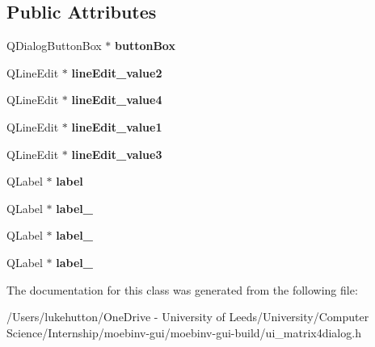 \subsection*{Public Attributes}
\begin{DoxyCompactItemize}
\item 
\mbox{\label{class_ui__matrix4dialog_ae643e32c20b920b6ab7339075a79bd9d}} 
Q\+Dialog\+Button\+Box $\ast$ {\bfseries button\+Box}
\item 
\mbox{\label{class_ui__matrix4dialog_aa24b0549035d7da282a7a26c4076a08b}} 
Q\+Line\+Edit $\ast$ {\bfseries line\+Edit\+\_\+value2}
\item 
\mbox{\label{class_ui__matrix4dialog_a0f6b83ac50476be0a50fe6581c58c9ec}} 
Q\+Line\+Edit $\ast$ {\bfseries line\+Edit\+\_\+value4}
\item 
\mbox{\label{class_ui__matrix4dialog_af76878b0323618ee71de96e1ff096e88}} 
Q\+Line\+Edit $\ast$ {\bfseries line\+Edit\+\_\+value1}
\item 
\mbox{\label{class_ui__matrix4dialog_ab323365f4524b26c3aa16ca9cc2375c3}} 
Q\+Line\+Edit $\ast$ {\bfseries line\+Edit\+\_\+value3}
\item 
\mbox{\label{class_ui__matrix4dialog_a251052fdd26c4f5d32480e10b296be69}} 
Q\+Label $\ast$ {\bfseries label}
\item 
\mbox{\label{class_ui__matrix4dialog_af1865005bfda4019dcf37b95b5c6e0d7}} 
Q\+Label $\ast$ {\bfseries label\+\_}
\item 
\mbox{\label{class_ui__matrix4dialog_a855424564cf682a5b813162db19932c7}} 
Q\+Label $\ast$ {\bfseries label\+\_}
\item 
\mbox{\label{class_ui__matrix4dialog_aaccd6a9185cebcd9bafe533642500165}} 
Q\+Label $\ast$ {\bfseries label\+\_}
\end{DoxyCompactItemize}


The documentation for this class was generated from the following file\+:\begin{DoxyCompactItemize}
\item 
/\+Users/lukehutton/\+One\+Drive -\/ University of Leeds/\+University/\+Computer Science/\+Internship/moebinv-\/gui/moebinv-\/gui-\/build/ui\+\_\+matrix4dialog.\+h\end{DoxyCompactItemize}
